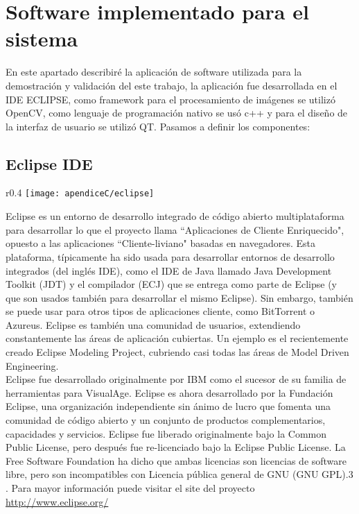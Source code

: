 \chapter{Software implementado para el sistema}
\label{ape:apendiceC}
En este apartado describiré la aplicación de software utilizada 
para la demostración y validación del este trabajo, la aplicación
fue desarrollada en  el IDE ECLIPSE, como framework para el 
procesamiento de imágenes se utilizó OpenCV, como lenguaje de 
programación nativo se usó c++ y para el diseño de la interfaz de
usuario se utilizó QT. Pasamos a definir los componentes: 

\section{Eclipse IDE}

\begin{wrapfigure}{r}{0.4\textwidth}
    \texttt{[image: apendiceC/eclipse]}
\end{wrapfigure}
 
Eclipse es un entorno de desarrollo integrado de código abierto multiplataforma 
para desarrollar lo que el proyecto llama ``Aplicaciones de Cliente Enriquecido", 
opuesto a las aplicaciones ``Cliente-liviano" basadas en navegadores. 
Esta plataforma, típicamente ha sido usada para desarrollar entornos de desarrollo 
integrados (del inglés IDE), como el IDE de Java llamado Java Development Toolkit (JDT) 
y el compilador (ECJ) que se entrega como parte de Eclipse (y que son usados también 
para desarrollar el mismo Eclipse). Sin embargo, también se puede usar para otros 
tipos de aplicaciones cliente, como BitTorrent o Azureus.
Eclipse es también una comunidad de usuarios, extendiendo constantemente las áreas 
de aplicación cubiertas. Un ejemplo es el recientemente creado Eclipse Modeling 
Project, cubriendo casi todas las áreas de Model Driven Engineering.\\
Eclipse fue desarrollado originalmente por IBM como el sucesor de su familia de 
herramientas para VisualAge. Eclipse es ahora desarrollado por la Fundación Eclipse, 
una organización independiente sin ánimo de lucro que fomenta una comunidad de código 
abierto y un conjunto de productos complementarios, capacidades y servicios.
Eclipse fue liberado originalmente bajo la Common Public License, pero después fue 
re-licenciado bajo la Eclipse Public License. La Free Software Foundation ha dicho 
que ambas licencias son licencias de software libre, pero son incompatibles con 
Licencia pública general de GNU (GNU GPL).3 . Para mayor información puede visitar 
el site del proyecto \url{http://www.eclipse.org/}

